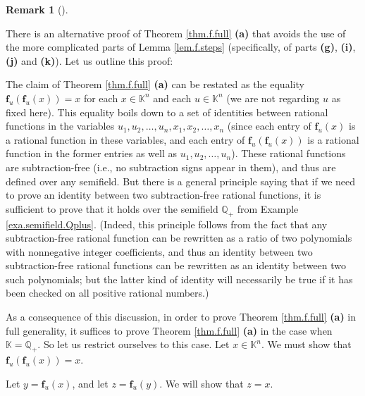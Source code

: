 \documentclass[numbers=enddot,12pt,final,onecolumn,notitlepage]{scrartcl}%
\theoremstyle{definition}
\newtheorem{remk}[theo]{Remark}
\newenvironment{remark}[1][]
{\begin{remk}[#1]\begin{leftbar}}
{\end{leftbar}\end{remk}}
\begin{document}
\begin{remark}
\label{rmk.f.invol-by-trick}There is an alternative proof of Theorem
\ref{thm.f.full} \textbf{(a)} that avoids the use of the more complicated
parts of Lemma \ref{lem.f.steps} (specifically, of parts \textbf{(g)},
\textbf{(i)}, \textbf{(j)} and \textbf{(k)}). Let us outline this proof:

The claim of Theorem \ref{thm.f.full} \textbf{(a)} can be restated as the
equality $\mathbf{f}_{u}\left(  \mathbf{f}_{u}\left(  x\right)  \right)  =x$
for each $x\in\mathbb{K}^{n}$ and each $u\in\mathbb{K}^{n}$ (we are not
regarding $u$ as fixed here). This equality boils down to a set of identities
between rational functions in the variables $u_{1},u_{2},\ldots,u_{n}%
,x_{1},x_{2},\ldots,x_{n}$ (since each entry of $\mathbf{f}_{u}\left(
x\right)  $ is a rational function in these variables, and each entry of
$\mathbf{f}_{u}\left(  \mathbf{f}_{u}\left(  x\right)  \right)  $ is a
rational function in the former entries as well as $u_{1},u_{2},\ldots,u_{n}%
$). These rational functions are subtraction-free (i.e., no subtraction signs
appear in them), and thus are defined over any semifield. But there is a
general principle saying that if we need to prove an identity between two
subtraction-free rational functions, it is sufficient to prove that it holds
over the semifield $\mathbb{Q}_{+}$ from Example \ref{exa.semifield.Qplus}.
(Indeed, this principle follows from the fact that any subtraction-free
rational function can be rewritten as a ratio of two polynomials with
nonnegative integer coefficients, and thus an identity between two
subtraction-free rational functions can be rewritten as an identity between
two such polynomials; but the latter kind of identity will necessarily be true
if it has been checked on all positive rational numbers.)

As a consequence of this discussion, in order to prove Theorem
\ref{thm.f.full} \textbf{(a)} in full generality, it suffices to prove Theorem
\ref{thm.f.full} \textbf{(a)} in the case when $\mathbb{K}=\mathbb{Q}_{+}$. So
let us restrict ourselves to this case. Let $x\in\mathbb{K}^{n}$. We must show
that $\mathbf{f}_{u}\left(  \mathbf{f}_{u}\left(  x\right)  \right)  =x$.

Let $y=\mathbf{f}_{u}\left(  x\right)  $, and let $z=\mathbf{f}_{u}\left(
y\right)  $. We will show that $z=x$.


\end{remark}
\end{document}
